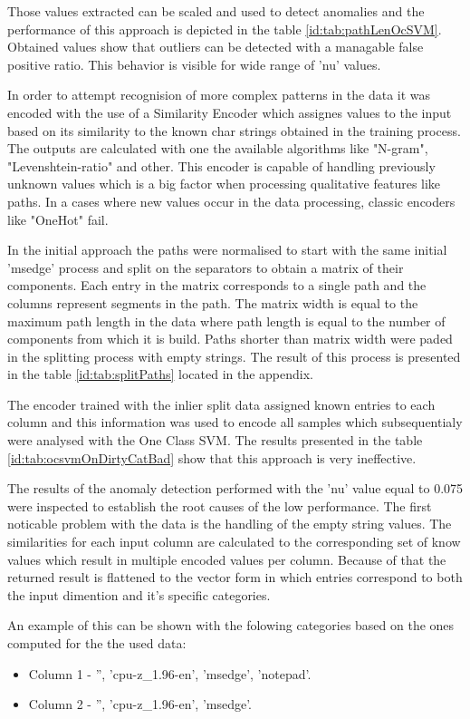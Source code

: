 \documentclass[a4paper,twoside,12pt]{book}
\begin{document}
Those values extracted can be scaled and used to detect anomalies and the performance
of this approach is depicted in the table \ref{id:tab:pathLenOcSVM}. Obtained values show that outliers can be
detected with a managable false positive ratio. This behavior is visible for wide range of 'nu' values. 

In order to attempt recognision of more complex patterns in the data it was encoded with
the use of a Similarity Encoder which assignes values to the input based on its similarity 
to the known char strings obtained in the training process. The outputs are calculated with 
one the available algorithms like "N-gram", "Levenshtein-ratio" and other. This encoder is
capable of handling previously unknown values which is a big factor when processing 
qualitative features like paths. In a cases where new values occur in the data processing,
classic encoders like "OneHot" fail. 

In the initial approach the paths were normalised to start with the same initial 'msedge' 
process and split on the separators to obtain a matrix of their components. Each entry in the
matrix corresponds to a single path and the columns represent segments in the path. The matrix
width is equal to the maximum path length in the data where path length is equal to the number
of components from which it is build. Paths shorter than matrix width were paded in the splitting
process with empty strings. The result of this process is presented in the table \ref{id:tab:splitPaths} 
located in the appendix. 

The encoder trained with the inlier split data assigned known entries to each column and this 
information was used to encode all samples which subsequentialy were analysed with the One Class
SVM. The results presented in the table \ref{id:tab:ocsvmOnDirtyCatBad} show that this approach is 
very ineffective. 

The results of the anomaly detection performed with the 'nu' value equal to 0.075 were inspected 
to establish the root causes of the low performance. The first noticable problem with the data
is the handling of the empty string values. The similarities for each input column are 
calculated to the corresponding set of know values which result in multiple encoded values per
column. Because of that the returned result is flattened to the vector form in which entries
correspond to both the input dimention and it's specific categories. 

An example of this can be shown with the folowing categories based on the ones computed 
for the the used data:
\begin{itemize}
	\item Column 1 - '', 'cpu-z\_1.96-en', 'msedge', 'notepad'.
	\item Column 2 - '', 'cpu-z\_1.96-en', 'msedge'.
\end{itemize}
\end{document}
